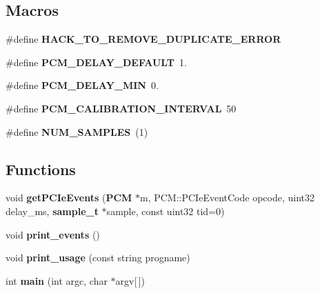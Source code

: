 \subsection*{Macros}
\begin{DoxyCompactItemize}
\item 
\#define {\bfseries H\+A\+C\+K\+\_\+\+T\+O\+\_\+\+R\+E\+M\+O\+V\+E\+\_\+\+D\+U\+P\+L\+I\+C\+A\+T\+E\+\_\+\+E\+R\+R\+O\+R}\label{pcm-pcie_8cpp_ac4eeb11d89b0f517835a12a04443ebe4}

\item 
\#define {\bfseries P\+C\+M\+\_\+\+D\+E\+L\+A\+Y\+\_\+\+D\+E\+F\+A\+U\+L\+T}~1.\label{pcm-pcie_8cpp_aa9ecc55c90c7a69729babc4f5f91ed96}

\item 
\#define {\bfseries P\+C\+M\+\_\+\+D\+E\+L\+A\+Y\+\_\+\+M\+I\+N}~0.\label{pcm-pcie_8cpp_acccbe8441d6dd75bdc949f5f0ee126c5}

\item 
\#define {\bfseries P\+C\+M\+\_\+\+C\+A\+L\+I\+B\+R\+A\+T\+I\+O\+N\+\_\+\+I\+N\+T\+E\+R\+V\+A\+L}~50\label{pcm-pcie_8cpp_a433dde946b6713059756318598c9a6fe}

\item 
\#define {\bfseries N\+U\+M\+\_\+\+S\+A\+M\+P\+L\+E\+S}~(1)\label{pcm-pcie_8cpp_af0b23eedf2352de4c1eff77e1401730c}

\end{DoxyCompactItemize}
\subsection*{Functions}
\begin{DoxyCompactItemize}
\item 
void {\bfseries get\+P\+C\+Ie\+Events} ({\bf P\+C\+M} $\ast$m, P\+C\+M\+::\+P\+C\+Ie\+Event\+Code opcode, uint32 delay\+\_\+ms, {\bf sample\+\_\+t} $\ast$sample, const uint32 tid=0)\label{pcm-pcie_8cpp_aa8c99791d2e27465fefdb7c2f8bbabd1}

\item 
void {\bfseries print\+\_\+events} ()\label{pcm-pcie_8cpp_a3193d1a8ca2451055cda0dc7cb39b71d}

\item 
void {\bfseries print\+\_\+usage} (const string progname)\label{pcm-pcie_8cpp_a4e43544978d9afb2faf08dce11cab70c}

\item 
int {\bfseries main} (int argc, char $\ast$argv[$\,$])\label{pcm-pcie_8cpp_a0ddf1224851353fc92bfbff6f499fa97}

\end{DoxyCompactItemize}
